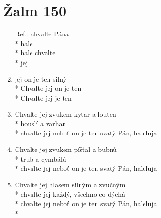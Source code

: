 \section{Žalm 150}
\begin{enumerate}
\item[Ref.:]   chvalte Pána \\*
hale   \\*
hale chvalte   \\*
 jej   
\item {} jej  on je ten silný \\*
Chvalte jej  on je ten  \\*
Chvalte jej   je ten    
\item Chvalte jej zvukem kytar a louten \\*
houslí a varhan \\*
chvalte jej neboť on je ten svatý Pán, haleluja 

\item Chvalte jej zvukem píšťal a bubnů \\*
trub a cymbálů \\*
chvalte jej neboť on je ten svatý Pán, haleluja 
\item Chvalte jej hlasem silným a zvučným \\*
chvalte jej každý, všechno co dýchá \\*
chvalte jej neboť on je ten svatý Pán, haleluja \\*
\end{enumerate}
